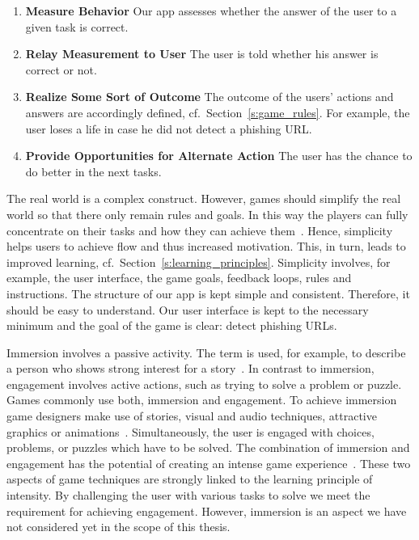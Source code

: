 \begin{description}[leftmargin=0cm]
\begin{enumerate}
	\item \textbf{Measure Behavior} Our app assesses whether the answer of the user to a given task is correct.
	\item \textbf{Relay Measurement to User} The user is told whether his answer is correct or not.
	\item \textbf{Realize Some Sort of Outcome} The outcome of the users' actions and answers are accordingly defined, cf.~Section~\ref{s:game_rules}. 
For example, the user loses a life in case he did not detect a phishing URL.
	\item \textbf{Provide Opportunities for Alternate Action} 
The user has the chance to do better in the next tasks.
\end{enumerate}
	\item[Simplicity] The real world is a complex construct.
However, games should simplify the real world so that there only remain rules and goals.
In this way the players can fully concentrate on their tasks and how they can achieve them~\cite{csikszentmihalyi1997finding}.
Hence, simplicity helps users to achieve flow and thus increased motivation. 
This, in turn, leads to improved learning, cf.~Section~\ref{s:learning_principles}.
Simplicity involves, for example, the user interface, the game goals, feedback loops, rules and instructions.
The structure of our app is kept simple and consistent.
Therefore, it should be easy to understand.
Our user interface is kept to the necessary minimum and the goal of the game is clear: detect phishing URLs.
	\item[Immersion and Engagement] Immersion involves a passive activity. 
The term is used, for example, to describe a person who shows strong interest for a story~\cite{mcmahan2003immersion}. 
In contrast to immersion, engagement involves active actions, such as trying to solve a problem or puzzle.
Games commonly use both, immersion and engagement.
To achieve immersion game designers make use of stories, visual and audio techniques, attractive graphics or animations~\cite{schell2008art}.
Simultaneously, the user is engaged with choices, problems, or puzzles which have to be solved.
The combination of immersion and engagement has the potential of creating an intense game experience~\cite{murphy2011games}.
These two aspects of game techniques are strongly linked to the learning principle of intensity.
By challenging the user with various tasks to solve we meet the requirement for achieving engagement. 
However, immersion is an aspect we have not considered yet in the scope of this thesis.

\end{description}
